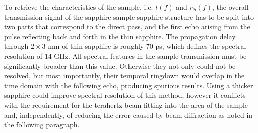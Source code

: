 
To retrieve the characteristics of the sample, i.e. $t(f)$ and $r_S(f)$, the overall transmission signal of the sapphire-sample-sapphire structure has to be split into two parts that correspond to the direct pass, and the first echo arising from the pulse reflecting back and forth  in the thin sapphire.
The propagation delay through $2\times 3$ mm of thin sapphire is roughly 70 ps, which defines the spectral resolution of 14 GHz. All spectral features in the sample transmission must be significantly broader than this value. Otherwise they not only could not be resolved, but most importantly, their temporal ringdown would overlap in the time domain with the following echo, producing spurious results. Using a thicker sapphire could improve spectral resolution of this method, however it conflicts with the requirement for the terahertz beam fitting into the area of the sample \cite{nemec2009tunable} and, independently, of reducing the error caused by beam diffraction as noted in the following paragraph.

